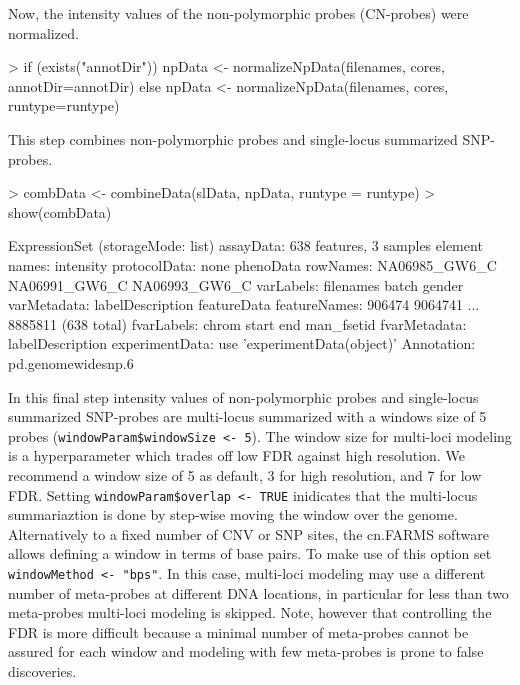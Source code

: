 \documentclass[article]{bioinf}
\begin{document}
\noindent Now, the intensity values of the non-polymorphic probes (CN-probes) were normalized.

\begin{Sinput}
> if (exists("annotDir")) {
	npData <- normalizeNpData(filenames, cores, annotDir=annotDir)	
 } else {
	npData <- normalizeNpData(filenames, cores, runtype=runtype)
 }
\end{Sinput}

\noindent This step combines non-polymorphic probes and single-locus summarized SNP-probes.

\begin{Schunk}
\begin{Sinput}
> combData <- combineData(slData, npData, runtype = runtype)
> show(combData)
\end{Sinput}
\begin{Soutput}
ExpressionSet (storageMode: list)
assayData: 638 features, 3 samples 
  element names: intensity 
protocolData: none
phenoData
  rowNames: NA06985_GW6_C NA06991_GW6_C NA06993_GW6_C
  varLabels: filenames batch gender
  varMetadata: labelDescription
featureData
  featureNames: 906474 9064741 ... 8885811 (638 total)
  fvarLabels: chrom start end man_fsetid
  fvarMetadata: labelDescription
experimentData: use 'experimentData(object)'
Annotation: pd.genomewidesnp.6 
\end{Soutput}
\end{Schunk}

\noindent In this final step intensity values of non-polymorphic probes and single-locus 
summarized SNP-probes are multi-locus summarized with a windows size of 5 probes  (\verb+windowParam$windowSize <- 5+).
The window size for multi-loci modeling is 
a hyperparameter which trades off low FDR against high resolution. 
We recommend a window size of 5 as default, 3 for high
resolution, and 7 for low FDR. Setting \verb+windowParam$overlap <- TRUE+ inidicates that
the multi-locus summariaztion is done by step-wise moving the window over the genome. 
Alternatively to a fixed number of CNV or
SNP sites, the cn.FARMS software allows defining a window in terms of base pairs. To make 
use of this option set \verb+windowMethod <- "bps"+. 
In this case, multi-loci modeling may use a different number
of meta-probes at different DNA locations, in particular for less than
two meta-probes multi-loci modeling is skipped. 
Note, however that controlling the FDR is more
difficult because a minimal number of meta-probes cannot be assured
for each window and modeling with few meta-probes is prone to false discoveries.
\end{document}
